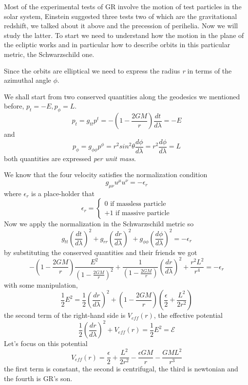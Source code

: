 Most of the experimental tests of GR involve the motion of test particles in the solar system, Einstein suggested three tests two of which are the gravitational redshift, we talked about it above and the precession of perihelia. Now we will study the latter. To start we need to understand how the motion in the plane of the ecliptic works and in particular how to describe orbits in this particular metric, the Schwarzschild one.\par
Since the orbits are elliptical we need to express the radius \emph{r} in terms of the azimuthal angle $\phi $. \par
We shall start from two conserved quantities along the geodesics we mentioned before, $p_{t} = - E, p_{\phi } = L$.
\[
p_{t } = g_{tt}p^{t} = - \left( 1- \frac{2GM}{r} \right) \frac{d t}{d \lambda } = - E
\]
and 
\[
p_{\phi } = g_{\phi \phi } p^{\phi } = r^{2} sin^{2}\theta \frac{d \phi }{d \lambda } = r^{2} \frac{d \phi }{d \lambda } = L
\]
both quantities are expressed \emph{per unit mass}.\par
We know that the four velocity satisfies the normalization condition
\[
g_{\mu \nu }u^{\mu }u^{\nu } = - \epsilon_{r}
\]
where $\epsilon_{r}$ is a place-holder that
\[
\epsilon _{r} = \begin{cases}
 0 \text{ if massless particle }\\
 +1 \text{ if massive particle}
\end{cases}
\]
Now we apply the normalization in the Schwarzschild metric so
\begin{equation}
g_{tt}\left( \frac{d t}{d \lambda } \right)^{2} + g_{rr}\left( \frac{d r}{d \lambda } \right)^{2} + g_{\phi \phi }\left( \frac{d \phi }{d \lambda } \right)^{2}  = - \epsilon_{r}
\end{equation}
by substituting the conserved quantities and their friends we got
\begin{equation}
-\left( 1- \frac{2GM}{r} \right) \frac{E^{2}}{\left( 1- \frac{2GM}{r} \right)^{2}} + \frac{1}{\left( 1 - \frac{2GM}{r} \right)}\left( \frac{d r}{d \lambda }\right)^{2} + \frac{r^{2}L^{2}}{r^{4}} = - \epsilon_{r}
\end{equation}
with some manipulation,
\begin{equation}
\frac{1}{2}E^{2} = \frac{1}{2} \left( \frac{d r}{d \lambda } \right)^{2} + \left( 1- \frac{2GM}{r} \right)\left( \frac{\epsilon }{2} + \frac{L^{2}}{2r^{2}} \right)
\end{equation}
the second term of the right-hand side is $V_{eff}\left( r \right)$, the effective potential
\begin{equation}
\frac{1}{2} \left( \frac{d r}{d \lambda } \right)^{2} + V_{eff}\left( r \right) = \frac{1}{2}E^{2} = \mathcal{E} 
\end{equation}
Let's focus on this potential
\begin{equation}\label{eq:566}
V_{eff}\left( r \right) = \frac{\epsilon }{2} + \frac{L^{2}}{2r^{2}}- \frac{\epsilon GM}{r} - \frac{GML^{2}}{r^{3}}
\end{equation}
the first term is constant, the second is centrifugal, the third is newtonian and the fourth is GR's son.


